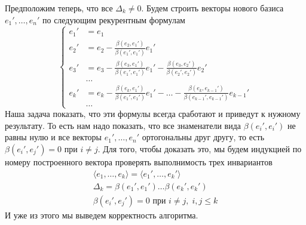 Предположим теперь, что все $\Delta_k\neq 0$.
Будем строить векторы нового базиса $e_1',\ldots,e_n'$ по следующим рекурентным формулам
\[
\left\{
\begin{aligned}
e_1' &= e_1\\
e_2'  &= e_2 - \frac{\beta(e_2, e_1')}{\beta(e_1',e_1')}e_1'\\
e_3'  &= e_3 - \frac{\beta(e_3, e_1')}{\beta(e_1',e_1')}e_1'- \frac{\beta(e_3, e_2')}{\beta(e_2',e_2')}e_2'\\
&\ldots\\
e_k' &= e_k - \frac{\beta(e_k, e_1')}{\beta(e_1',e_1')}e_1' - \ldots - \frac{\beta(e_k, e_{k-1}')}{\beta(e_{k-1}',e_{k-1}')}e_{k-1}'\\
&\ldots
\end{aligned}
\right.
\]
Наша задача показать, что эти формулы всегда сработают и приведут к нужному результату.
То есть нам надо показать, что все знаменатели вида $\beta(e_i',e_i')$ не равны нулю и все векторы $e_1',\ldots,e_n'$ ортогональны друг другу, то есть $\beta(e_i', e_j') = 0$ при $i\neq j$.
Для того, чтобы доказать это, мы будем индукцией по номеру построенного вектора проверять выполнимость трех инвариантов
\begin{gather*}
\langle e_1,\ldots,e_k\rangle = \langle e_1',\ldots, e_k'\rangle\\
\Delta_k = \beta(e_1',e_1') \ldots \beta(e_k',e_k')\\
\beta(e_i',e_j') = 0\text{ при }i\neq j,\;i,j\leqslant k
\end{gather*}
И уже из этого мы выведем корректность алгоритма.


